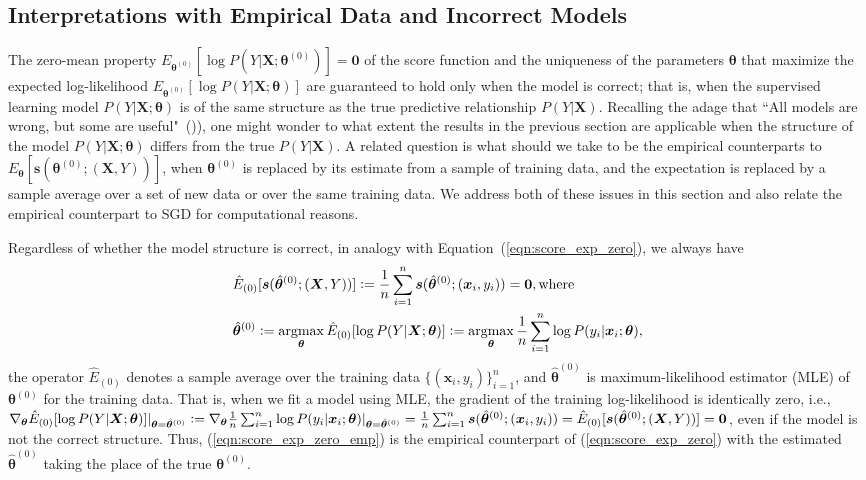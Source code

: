\documentclass[twoside,11pt]{article}
\DeclareMathOperator*{\argmax}{argmax} %
\begin{document}
\subsection{Interpretations with Empirical Data and Incorrect Models}
\label{ss:sgd_score}
The zero-mean property $E_{\bm{\theta}^{(0)}}[\log{P(Y|\bm{X}; \bm{\theta}^{(0)})}] = \textbf{0}$ of the score function and the uniqueness of the parameters $\bm{\theta}$ that maximize the expected log-likelihood $E_{\bm{\theta}^{(0)}}[\log P(Y|\bm{X}; \bm{\theta})]$ are guaranteed to hold only when the model is correct; that is, when the supervised learning model $P(Y|\bm{X};\bm{\theta})$ is of the same structure as the true predictive relationship $P(Y|\bm{X})$. Recalling the adage that ``All models are wrong, but some are useful"~(\cite{box1976science})), one might wonder to what extent the results in the previous section are applicable when the structure of the model $P(Y|\bm{X};\bm{\theta})$ differs from the true $P(Y|\bm{X})$. A related question is what should we take to be the empirical counterparts to $E_{\bm{\theta}}[\bm{s}(\bm{\theta}^{(0)};(\bm{X},Y) )]$, when $\bm{\theta}^{(0)}$ is replaced by its estimate from a sample of training data, and the expectation is replaced by a sample average over a set of new data or over the same training data. We address both of these issues in this section and also relate the empirical counterpart to SGD for computational reasons. 

Regardless of whether the model structure is correct, in analogy with Equation~(\ref{eqn:score_exp_zero}), we always have
\begin{align}
\begin{aligned}
&\hat{E}_{(0)}[\bm{s}(\hat{\bm{\theta}}^{(0)};(\bm{X}, Y))] \vcentcolon=\frac{1}{n}\sum_{i=1}^{n}\bm{s}(\hat{\bm{\theta}}^{(0)};(\bm{x}_i, y_i))=\bm{0}, \text{where} \\
&\hat{\bm{\theta}}^{(0)} \vcentcolon =  \argmax_{\bm{\theta}}\hat{E}_{(0)}[\log{P(Y|\bm{X}; \bm{\theta})}] \vcentcolon= \argmax_{\bm{\theta}}\frac{1}{n}\sum_{i=1}^n \log{P(y_i|\bm{x}_i;\bm{\theta})},
\end{aligned}
\label{eqn:score_exp_zero_emp}
\end{align}   
the operator $\hat{E}_{(0)}$ denotes a sample average over the training data $\{(\bm{x}_i, y_i)\}_{i=1}^n$, and $\hat{\bm{\theta}}^{(0)}$ is maximum-likelihood estimator (MLE) of $\bm{\theta}^{(0)}$ for the training data. That is, when we fit a model using MLE, the gradient of the training log-likelihood is identically zero, i.e., $\nabla_{\bm{\theta}}\hat{E}_{(0)}[\log{P(Y|\bm{X}; {\bm{\theta}})}]|_{\bm{\theta}=\hat{\bm{\theta}}^{(0)}} \vcentcolon=\nabla_{\bm{\theta}}\frac{1}{n}\sum_{i=1}^n \log{P(y_i|\bm{x}_i;{\bm{\theta}})|_{\bm{\theta}=\hat{\bm{\theta}}^{(0)}}}=\frac{1}{n}\sum_{i=1}^n\bm{s}(\hat{\bm{\theta}}^{(0)};(\bm{x}_i, y_i)) = \hat{E}_{(0)}[\bm{s}(\hat{\bm{\theta}}^{(0)};(\bm{X}, Y))]=\bm{0}$, even if the model is not the correct structure. Thus, (\ref{eqn:score_exp_zero_emp}) is the empirical counterpart of (\ref{eqn:score_exp_zero}) with the estimated $\hat{\bm{\theta}}^{(0)}$ taking the place of the true $\bm{\theta}^{(0)}$. 
\end{document}
